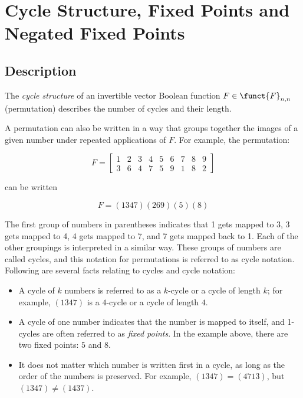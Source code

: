 \section{Cycle Structure, Fixed Points and Negated Fixed Points}
\label{sec:CS}

\subsection{Description}

\begin{definition}
The \textit{cycle structure} of an invertible vector Boolean function $F \in \funct{F}_{n,n}$ (permutation) describes the number of cycles and their length.
\end{definition}

A permutation can also be written in a way that groups together the images of a given number under repeated applications of $F$. For example, the permutation:

\begin{equation}
F = \begin{bmatrix} 
1 & 2 & 3 & 4 & 5 & 6 & 7 & 8 & 9 \\
3 & 6 & 4 & 7 & 5 & 9 & 1 & 8 & 2
\end{bmatrix}
\end{equation}

can be written

\begin{equation}
F = (1 3 4 7)(2 6 9)(5)(8)
\end{equation}

The first group of numbers in parentheses indicates that 1 gets mapped to 3, 3 gets mapped to 4, 4 gets mapped to 7, and 7 gets mapped back to 1. Each of the other groupings is interpreted in a similar way. These groups of numbers are called cycles, and this notation for permutations is referred to as cycle notation. Following are several facts relating to cycles and cycle notation:

\begin{itemize}
\item A cycle of $k$ numbers is referred to as a $k$-cycle or a cycle of length $k$; for example, $(1 3 4 7)$ is a $4$-cycle or a cycle of length $4$.

\item A cycle of one number indicates that the number is mapped to itself, and 1-cycles are often referred to as \textit{fixed points}. In the example above, there are two fixed points: $5$ and $8$.

\item It does not matter which number is written first in a cycle, as long as the order of the numbers is preserved. For example, $(1 3 4 7) = (4 7 1 3)$, but $(1 3 4 7) \neq (1 4 3 7)$.
\end{itemize}

